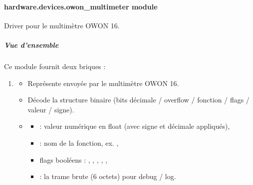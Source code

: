 \documentclass[letterpaper,10pt,french]{sphinxmanual}
\begin{document}
\paragraph{hardware.devices.owon\_multimeter module}
\label{\detokenize{api/hardware.devices:module-hardware.devices.owon_multimeter}}\label{\detokenize{api/hardware.devices:hardware-devices-owon-multimeter-module}}
\sphinxAtStartPar
Driver pour le multimètre OWON 16.


\subparagraph{Vue d’ensemble}
\label{\detokenize{api/hardware.devices:id2}}
\sphinxAtStartPar
Ce module fournit deux briques :
\begin{enumerate}
%
\item {} \begin{itemize}
\item {} 
\sphinxAtStartPar
Représente  envoyée par le multimètre OWON 16.

\item {} 
\sphinxAtStartPar
Décode la structure binaire (bits décimale / overflow / fonction / flags / valeur / signe).

\item {} \begin{description}
\begin{itemize}
\item {} 
\sphinxAtStartPar
{}           : valeur numérique en float (avec signe et décimale appliqués),

\item {} 
\sphinxAtStartPar
{}       : nom de la fonction, ex. ,

\item {} 
\sphinxAtStartPar
flags booléens    : , , , , ,

\item {} 
\sphinxAtStartPar
{}        : la trame brute (6 octets) pour debug / log.

\end{itemize}


\end{description}
\end{itemize}
\end{enumerate}
\end{document}
